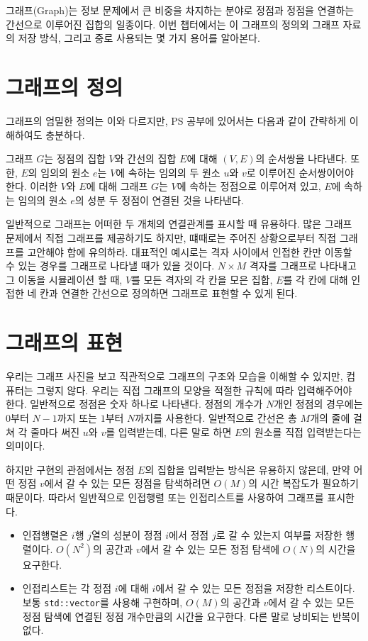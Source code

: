 그래프(Graph)는 정보 문제에서 큰 비중을 차지하는 분야로 정점과 정점을 연결하는 간선으로 이루어진 집합의 일종이다. 이번 챕터에서는 이 그래프의 정의외 그래프 자료의 저장 방식, 그리고 중로 사용되는 몇 가지 용어를 알아본다.

\section{그래프의 정의}
그래프의 엄밀한 정의는 이와 다르지만, PS 공부에 있어서는 다음과 같이 간략하게 이해하여도 충분하다.

\begin{definition}
    그래프 $G$는 정점의 집합 $V$와 간선의 집합 $E$에 대해 $(V, E)$의 순서쌍을 나타낸다. 또한, $E$의 임의의 원소 $e$는 $V$에 속하는 임의의 두 원소 $u$와 $v$로 이루어진 순서쌍이어야 한다.
    이러한 $V$와 $E$에 대해 그래프 $G$는 $V$에 속하는 정점으로 이루어져 있고, $E$에 속하는 임의의 원소 $e$의 성분 두 정점이 연결된 것을 나타낸다.
\end{definition}

일반적으로 그래프는 어떠한 두 개체의 연결관계를 표시할 때 유용하다. 많은 그래프 문제에서 직접 그래프를 제공하기도 하지만, 떄때로는 주어진 상황으로부터 직접 그래프를 고안해야 함에 유의하라.
대표적인 예시로는 격자 사이에서 인접한 칸만 이동할 수 있는 경우를 그래프로 나타낼 때가 있을 것이다. $N \times M$ 격자를 그래프로 나타내고 그 이동을 시뮬레이션 할 때, $V$를 모든 격자의 각 칸을 모은 집합, $E$를 각 칸에 대해 인접한 네 칸과 연결한 간선으로 정의하면 그래프로 표현할 수 있게 된다.

\section{그래프의 표현}
우리는 그래프 사진을 보고 직관적으로 그래프의 구조와 모습을 이해할 수 있지만, 컴퓨터는 그렇지 않다. 우리는 직접 그래프의 모양을 적절한 규칙에 따라 입력해주어야 한다.
일반적으로 정점은 숫자 하나로 나타낸다. 정점의 개수가 $N$개인 정점의 경우에는 $0$부터 $N-1$까지 또는 $1$부터 $N$까지를 사용한다.
일반적으로 간선은 총 $M$개의 줄에 걸쳐 각 줄마다 써진 $u$와 $v$를 입력받는데, 다른 말로 하면 $E$의 원소를 직접 입력받는다는 의미이다.

하지만 구현의 관점에서는 정점 $E$의 집합을 입력받는 방식은 유용하지 않은데, 만약 어떤 정점 $v$에서 갈 수 있는 모든 정점을 탐색하려면 $O(M)$의 시간 복잡도가 필요하기 때문이다. 
따라서 일반적으로 인접행렬 또는 인접리스트를 사용하여 그래프를 표시한다.

\begin{itemize}
    \item 인접행렬은 $i$행 $j$열의 성분이 정점 $i$에서 정점 $j$로 갈 수 있는지 여부를 저장한 행렬이다. $O(N^2)$의 공간과 $v$에서 갈 수 있는 모든 정점 탐색에 $O(N)$의 시간을 요구한다.
    \item 인접리스트는 각 정점 $i$에 대해 $i$에서 갈 수 있는 모든 정점을 저장한 리스트이다. 보통 \texttt{std::vector}를 사용해 구현하며, $O(M)$의 공간과 $v$에서 갈 수 있는 모든 정점 탐색에 연결된 정점 개수만큼의 시간을 요구한다. 다른 말로 낭비되는 반복이 없다.
\end{itemize}

